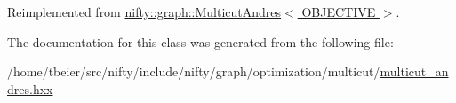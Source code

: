Reimplemented from \hyperlink{classnifty_1_1graph_1_1MulticutAndres_acc430246a8ed30d4b19c96effe7d6a4d}{nifty\+::graph\+::\+Multicut\+Andres$<$ O\+B\+J\+E\+C\+T\+I\+V\+E $>$}.



The documentation for this class was generated from the following file\+:\begin{DoxyCompactItemize}
\item 
/home/tbeier/src/nifty/include/nifty/graph/optimization/multicut/\hyperlink{multicut__andres_8hxx}{multicut\+\_\+andres.\+hxx}\end{DoxyCompactItemize}
